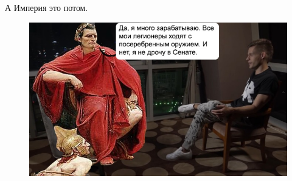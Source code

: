 А Империя это потом.

\begin{figure}[h!tb] 
	\centering\includegraphics[scale=0.6]{RexPublicaworks/1579286098174274121.png}
\end{figure}